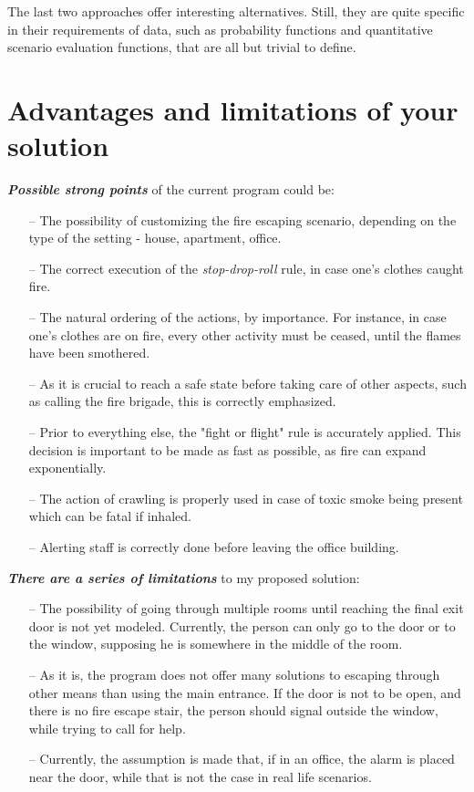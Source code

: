 \documentclass[a4paper,12pt]{report}
\begin{document}
The last two approaches offer interesting alternatives. 
Still, they are quite specific in their requirements of data, such as probability functions and quantitative scenario evaluation functions, that are all but trivial to define.


\section{Advantages and limitations of your solution}

{\it \textbf{ {\color {Blue} Possible strong points}}} of the current program could be:
\begin{itemize}
\item[--] The possibility of customizing the fire escaping scenario, depending on the type of the setting - house, apartment, office.
\item[--] The correct execution of the {\it stop-drop-roll } rule, in case one's clothes caught fire.
\item[--] The natural ordering of the actions, by importance. 
For instance, in case one's clothes are on fire, every other activity must be ceased, until the flames have been smothered.
\item[--] As it is crucial to reach a safe state before taking care of other aspects, such as calling the fire brigade, this is correctly emphasized.
\item[--] Prior to everything else, the "fight or flight" rule is accurately applied. 
This decision is important to be made as fast as possible, as fire can expand exponentially.
\item[--] The action of crawling is properly used in case of toxic smoke being present which can be fatal if inhaled.
\item[--] Alerting staff is correctly done before leaving the office building.
\end{itemize}

{\it \textbf{ {\color {Blue} There are a series of limitations }}} to my proposed solution:
\begin{itemize}
\item[--] The possibility of going through multiple rooms until reaching the final exit door is not yet modeled.
Currently, the person can only go to the door or to the window, supposing he is somewhere in the middle of the room.
\item[--] As it is, the program does not offer many solutions to escaping through other means than using the main entrance.
 If the door is not to be open, and there is no fire escape stair, the person should signal outside the window, while trying to call for help.
\item[--] Currently, the assumption is made that, if in an office, the alarm is placed near the door, while that is not the case in real life scenarios.

\end{itemize}
\end{document}
